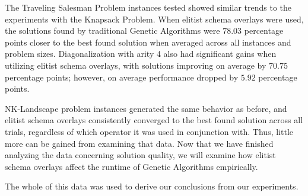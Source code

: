 %
%

The Traveling Salesman Problem instances tested showed similar trends to the experiments with the Knapsack Problem. When elitist schema overlays were used, the solutions found by traditional Genetic Algorithms were $78.03$ percentage points closer to the best found solution when averaged across all instances and problem sizes. Diagonalization with arity 4 also had significant gains when utilizing elitist schema overlays, with solutions improving on average by $70.75$ percentage points; however, on average performance dropped by $5.92$ percentage points.


NK-Landscape problem instances generated the same behavior as before, and elitist schema overlays consistently converged to the best found solution across all trials, regardless of which operator it was used in conjunction with. Thus, little more can be gained from examining that data. Now that we have finished analyzing the data concerning solution quality, we will examine how elitist schema overlays affect the runtime of Genetic Algorithms empirically. 

%
%

 The whole of this data was used to derive our conclusions from our experiments.
